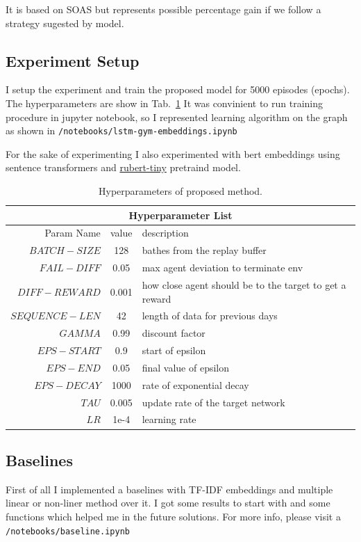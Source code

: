 \documentclass{article}
\begin{document}
It is based on SOAS but represents possible percentage gain if we follow a strategy sugested by model.


\subsection{Experiment Setup}
I setup the experiment and train the proposed model for 5000 episodes (epochs).
The hyperparameters are show in Tab.~\ref{tab:hyperparams}
It was convinient to run training procedure in jupyter notebook, so I represented learning algorithm on the graph as shown in \texttt{/notebooks/lstm-gym-embeddings.ipynb}

For the sake of experimenting I also experimented with bert embeddings using sentence transformers and \href{https://huggingface.co/cointegrated/rubert-tiny}{rubert-tiny} pretraind model.

\begin{table}[tbh!]
\begin{center}
\begin{tabular}{ |r||c|l|  }
 \hline
 \multicolumn{3}{|c|}{Hyperparameter List} \\
 \hline
 Param Name & value & description \\
 \hline
 $BATCH-SIZE$   & 128    & bathes from the replay buffer\\
 $FAIL-DIFF$ & 0.05 & max agent deviation to terminate env\\ 
 $DIFF-REWARD$ & 0.001 & how close agent should be to the target to get a reward\\
 $SEQUENCE-LEN$ & 42 & length of data for previous days  \\
 $GAMMA$   & 0.99    & discount factor\\
 $EPS-START$ & 0.9    & start of epsilon\\
 $EPS-END$ &  0.05    & final value of epsilon\\
 $EPS-DECAY$ &  1000    & rate of exponential decay\\
 $TAU$ &  0.005    &update rate of the target network\\
 $LR$ &  1e-4    &learning rate\\
 \hline
\end{tabular}
\caption{Hyperparameters of proposed method.}
\label{tab:hyperparams}
\end{center}
\end{table}


\subsection{Baselines}
First of all I implemented a baselines with TF-IDF embeddings and multiple linear or non-liner method over it. 
I got some results to start with and some functions which helped me in the future solutions.
For more info, please visit a \texttt{/notebooks/baseline.ipynb}
\end{document}
